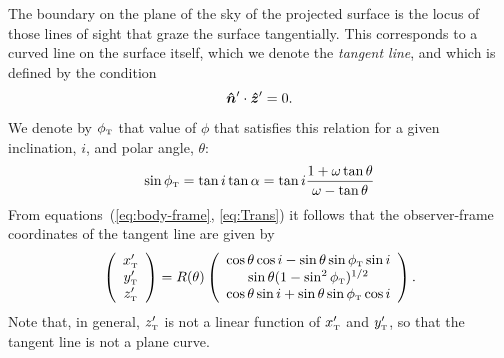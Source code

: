 
The boundary on the plane of the sky of the projected surface is the
locus of those lines of sight that graze the surface tangentially.
This corresponds to a curved line on the surface itself, which we
denote the \textit{tangent line}, and which is defined by the
condition  
\begin{equation}
  \label{eq:tangent-line-condition}
  \bm{\hat{n}}'\cdot \bm{\hat{z}}' = 0.
\end{equation}
We denote by \(\phi_{\mathrm{\scriptscriptstyle T}}\) that value of $\phi$ that satisfies this
relation for a given inclination, \(i\), and polar angle, \(\theta\):
\begin{equation}
\sin\phi_{\mathrm{\scriptscriptstyle T}} = \tan i\tan\alpha = \tan i \frac{1+\omega\tan\theta}{\omega-\tan\theta}
\label{eq:tanphi}
\end{equation}
From equations~(\ref{eq:body-frame}, \ref{eq:Trans}) it follows that
the observer-frame coordinates of the tangent line are given by
\begin{equation}
\left(\begin{array}{c}
x'_{\mathrm{\scriptscriptstyle T}} \\ y'_{\mathrm{\scriptscriptstyle T}} \\ z'_{\mathrm{\scriptscriptstyle T}}
\end{array}\right)= R(\theta)\left(\begin{array}{c}
\cos\theta\cos i - \sin\theta\sin\phi_{\mathrm{\scriptscriptstyle T}} \sin i \\
\sin\theta(1-\sin^2\phi_{\mathrm{\scriptscriptstyle T}})^{1/2} \\
\cos\theta\sin i +\sin\theta\sin\phi_{\mathrm{\scriptscriptstyle T}}\cos i
\end{array}\right).
\label{eq:tangential}
\end{equation} 
Note that, in general, \(z'_{\mathrm{\scriptscriptstyle T}}\) is not a linear function of \(x'_{\mathrm{\scriptscriptstyle T}}\)
and \(y'_{\mathrm{\scriptscriptstyle T}}\), so that the tangent line is not a plane curve. 

